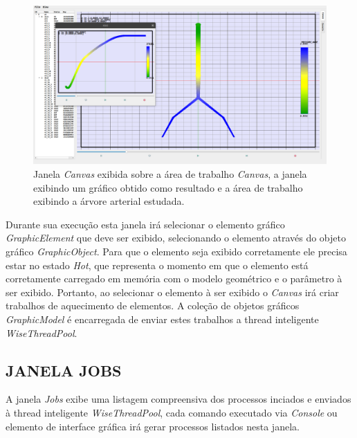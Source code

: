 \begin{figure}[!htbp]
	\centering
	\includegraphics[width=\linewidth]{Figures/IGU_025.png}
	\caption{Janela \textit{Canvas} exibida sobre a área de trabalho \textit{Canvas}, a janela exibindo um gráfico obtido como resultado e a área de trabalho exibindo a árvore arterial estudada.}
	\label{fig:canvas}
\end{figure}

Durante sua execução esta janela irá selecionar o elemento gráfico \textit{GraphicElement} que deve ser exibido, selecionando o elemento através do objeto gráfico \textit{GraphicObject}. Para que o elemento seja exibido corretamente ele precisa estar no estado \textit{Hot}, que representa o momento em que o elemento está corretamente carregado em memória com o modelo geométrico e o parâmetro à ser exibido. Portanto, ao selecionar o elemento à ser exibido o \textit{Canvas} irá criar trabalhos de aquecimento de elementos. A coleção de objetos gráficos \textit{GraphicModel} é encarregada de enviar estes trabalhos a thread inteligente \textit{WiseThreadPool}.

\subsection{JANELA JOBS}\label{sec:janela_jobs}

A janela \textit{Jobs} exibe uma listagem compreensiva dos processos inciados e enviados à thread inteligente \textit{WiseThreadPool}, cada comando executado via \textit{Console} ou elemento de interface gráfica irá gerar processos listados nesta janela.

